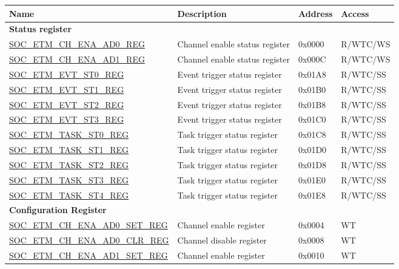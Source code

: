 \begin{longtable}{ | p{6cm} | p{6.2cm} | p{1.3cm} | p{2cm} | }
\hline\rowcolor{lightgray}
\textbf{Name} & \textbf{Description} &  \textbf{Address} & \textbf{Access} \\ \hline
\endhead
\multicolumn{4}{|l|}{\textbf{Status register}} \\ \hline
\hyperref[regdesc:SOCETMCHENAAD0REG]{SOC\_ETM\_CH\_ENA\_AD0\_REG} & Channel enable status register & 0x0000 & R/WTC/WS \\ \hline
\hyperref[regdesc:SOCETMCHENAAD1REG]{SOC\_ETM\_CH\_ENA\_AD1\_REG} & Channel enable status register & 0x000C & R/WTC/WS \\ \hline
\hyperref[regdesc:SOCETMEVTST0REG]{SOC\_ETM\_EVT\_ST0\_REG} & Event trigger status register & 0x01A8 & R/WTC/SS \\ \hline
\hyperref[regdesc:SOCETMEVTST1REG]{SOC\_ETM\_EVT\_ST1\_REG} & Event trigger status register & 0x01B0 & R/WTC/SS \\ \hline
\hyperref[regdesc:SOCETMEVTST2REG]{SOC\_ETM\_EVT\_ST2\_REG} & Event trigger status register & 0x01B8 & R/WTC/SS \\ \hline
\hyperref[regdesc:SOCETMEVTST3REG]{SOC\_ETM\_EVT\_ST3\_REG} & Event trigger status register & 0x01C0 & R/WTC/SS \\ \hline
\hyperref[regdesc:SOCETMTASKST0REG]{SOC\_ETM\_TASK\_ST0\_REG} & Task trigger status register & 0x01C8 & R/WTC/SS \\ \hline
\hyperref[regdesc:SOCETMTASKST1REG]{SOC\_ETM\_TASK\_ST1\_REG} & Task trigger status register & 0x01D0 & R/WTC/SS \\ \hline
\hyperref[regdesc:SOCETMTASKST2REG]{SOC\_ETM\_TASK\_ST2\_REG} & Task trigger status register & 0x01D8 & R/WTC/SS \\ \hline
\hyperref[regdesc:SOCETMTASKST3REG]{SOC\_ETM\_TASK\_ST3\_REG} & Task trigger status register & 0x01E0 & R/WTC/SS \\ \hline
\hyperref[regdesc:SOCETMTASKST4REG]{SOC\_ETM\_TASK\_ST4\_REG} & Task trigger status register & 0x01E8 & R/WTC/SS \\ \hline
\multicolumn{4}{|l|}{\textbf{Configuration Register}} \\ \hline
\hyperref[regdesc:SOCETMCHENAAD0SETREG]{SOC\_ETM\_CH\_ENA\_AD0\_SET\_REG} & Channel enable register & 0x0004 & WT \\ \hline
\hyperref[regdesc:SOCETMCHENAAD0CLRREG]{SOC\_ETM\_CH\_ENA\_AD0\_CLR\_REG} & Channel disable register & 0x0008 & WT \\ \hline
\hyperref[regdesc:SOCETMCHENAAD1SETREG]{SOC\_ETM\_CH\_ENA\_AD1\_SET\_REG} & Channel enable register & 0x0010 & WT \\ \hline

\end{longtable}
